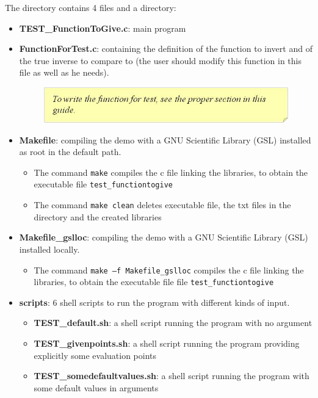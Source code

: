 \documentclass[10pt]{article}
\begin{document}
The directory contains 4 files and a directory:
\begin{itemize}
 \item \textbf{TEST\_FunctionToGive.c}: main program

 \item \textbf{FunctionForTest.c}: containing the definition of the function to invert and of the true inverse to compare to (the user should modify this function in this file as well as he needs).

\begin{figure}[!h]
\begin{flushright}

\includegraphics[scale=0.8]{Immagine10}

\end{flushright}
\end{figure}


 \item \textbf{Makefile}: compiling the demo with a GNU Scientific Library (GSL) installed as root in the default path.
	    \begin{itemize}
	    \item The command {\tt make} compiles the c file linking the libraries, to obtain the executable file {\tt test\_functiontogive}
	    \item The command {\tt make clean} deletes executable file, the txt files in the directory and the created libraries
	    \end{itemize}
 \item \textbf{Makefile\_gslloc}: compiling the demo with a GNU Scientific Library (GSL) installed locally.
	    \begin{itemize}
	    \item The command {\tt make –f Makefile\_gslloc} compiles the c file linking the libraries, to obtain the executable file file {\tt test\_functiontogive}
	    \end{itemize}
 \item \textbf{scripts}:	6 shell scripts to run the program with different kinds of input.
	    \begin{itemize}

	    \item \textbf{TEST\_default.sh}: a shell script running the program with no argument

	    \item \textbf{TEST\_givenpoints.sh}: a shell script running the program providing explicitly some evaluation points

	    \item  \textbf{TEST\_somedefaultvalues.sh}:	a shell script running the program with some default values in arguments
	    \end{itemize}
 \end{itemize}
\end{document}

